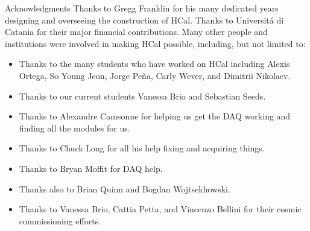 \documentclass[10pt]{beamer}
\newcommand{\hcal}{HCal}
\begin{document}
\begin{frame}{Acknowledgments}
Thanks to \alert{Gregg Franklin} for his many dedicated years designing and overseeing the construction of {\hcal}. Thanks to \alert{Universit\'{a} di Catania} for their major financial contributions. Many other people and institutions were involved in making {\hcal} possible, including, but not limited to:
    \begin{itemize}
        \item Thanks to the many students who have worked on {\hcal} including \alert{Alexis Ortega}, \alert{So Young Jeon}, \alert{Jorge Pe\~{n}a}, \alert{Carly Wever}, and  \alert{Dimitrii Nikolaev}. 
        \item Thanks to our current students \alert{Vanessa Brio} and \alert{Sebastian Seeds}.
        \item Thanks to \alert{Alexandre Camsonne} for helping us get the DAQ working and finding all the modules for us.
        \item Thanks to \alert{Chuck Long} for all his help fixing and acquiring things.
        \item Thanks to \alert{Bryan Moffit} for DAQ help.
        \item Thanks also to \alert{Brian Quinn} and \alert{Bogdan Wojtsekhowski}.
        \item Thanks to \alert{Vanessa Brio}, \alert{Cattia Petta}, and \alert{Vincenzo Bellini} for their cosmic commissioning efforts.%
    \end{itemize}

\end{frame}
\end{document}
